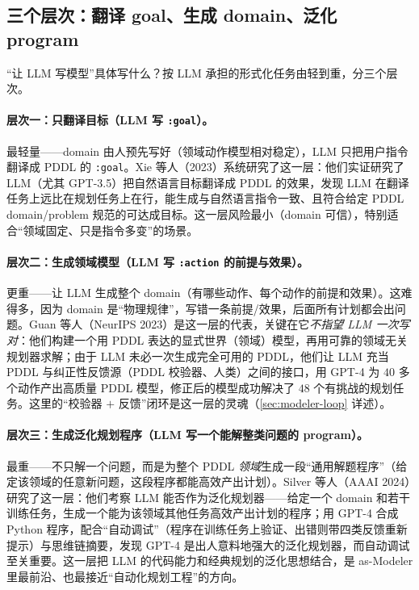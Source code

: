 \subsection{三个层次：翻译 goal、生成 domain、泛化 program}
\label{sec:modeler-levels}

“让 LLM 写模型”具体写什么？按 LLM 承担的形式化任务由轻到重，分三个层次。

\paragraph{层次一：只翻译目标（LLM 写 \texttt{:goal}）。}
最轻量——domain 由人预先写好（领域动作模型相对稳定），LLM 只把用户指令翻译成 PDDL 的 \texttt{:goal}。Xie 等人（2023）系统研究了这一层：他们实证研究了 LLM（尤其 GPT-3.5）把自然语言目标翻译成 PDDL 的效果，发现 LLM 在翻译任务上远比在规划任务上在行，能生成与自然语言指令一致、且符合给定 PDDL domain/problem 规范的可达成目标\cite{xie2023translating}。这一层风险最小（domain 可信），特别适合“领域固定、只是指令多变”的场景。

\paragraph{层次二：生成领域模型（LLM 写 \texttt{:action} 的前提与效果）。}
更重——让 LLM 生成整个 domain（有哪些动作、每个动作的前提和效果）。这难得多，因为 domain 是“物理规律”，写错一条前提/效果，后面所有计划都会出问题。Guan 等人（NeurIPS 2023）是这一层的代表，关键在它\emph{不指望 LLM 一次写对}：他们构建一个用 PDDL 表达的显式世界（领域）模型，再用可靠的领域无关规划器求解；由于 LLM 未必一次生成完全可用的 PDDL，他们让 LLM 充当 PDDL 与纠正性反馈源（PDDL 校验器、人类）之间的接口，用 GPT-4 为 $40$ 多个动作产出高质量 PDDL 模型，修正后的模型成功解决了 $48$ 个有挑战的规划任务\cite{guan2023worldmodel}。这里的“校验器 $+$ 反馈”闭环是这一层的灵魂（\cref{sec:modeler-loop} 详述）。

\paragraph{层次三：生成泛化规划程序（LLM 写一个能解整类问题的 program）。}
最重——不只解一个问题，而是为整个 PDDL \emph{领域}生成一段“通用解题程序”（给定该领域的任意新问题，这段程序都能高效产出计划）。Silver 等人（AAAI 2024）研究了这一层：他们考察 LLM 能否作为泛化规划器——给定一个 domain 和若干训练任务，生成一个能为该领域其他任务高效产出计划的程序；用 GPT-4 合成 Python 程序，配合“自动调试”（程序在训练任务上验证、出错则带四类反馈重新提示）与思维链摘要，发现 GPT-4 是出人意料地强大的泛化规划器，而自动调试至关重要\cite{silver2024generalized}。这一层把 LLM 的代码能力和经典规划的泛化思想结合，是 as-Modeler 里最前沿、也最接近“自动化规划工程”的方向。

